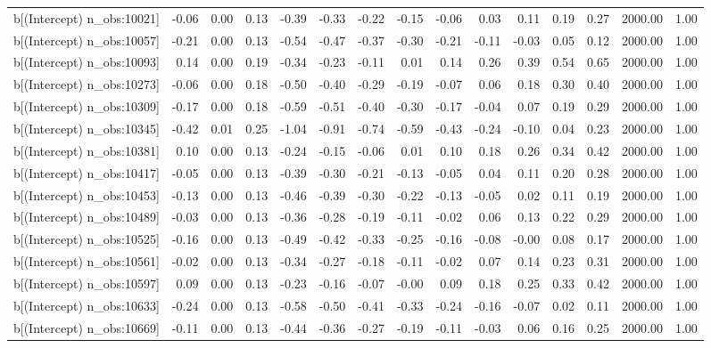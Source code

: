 \begin{table}[ht]
\begin{tabular}{rrrrrrrrrrrrrrr}
  b[(Intercept) n\_obs:10021] & -0.06 & 0.00 & 0.13 & -0.39 & -0.33 & -0.22 & -0.15 & -0.06 & 0.03 & 0.11 & 0.19 & 0.27 & 2000.00 & 1.00 \\ 
  b[(Intercept) n\_obs:10057] & -0.21 & 0.00 & 0.13 & -0.54 & -0.47 & -0.37 & -0.30 & -0.21 & -0.11 & -0.03 & 0.05 & 0.12 & 2000.00 & 1.00 \\ 
  b[(Intercept) n\_obs:10093] & 0.14 & 0.00 & 0.19 & -0.34 & -0.23 & -0.11 & 0.01 & 0.14 & 0.26 & 0.39 & 0.54 & 0.65 & 2000.00 & 1.00 \\ 
  b[(Intercept) n\_obs:10273] & -0.06 & 0.00 & 0.18 & -0.50 & -0.40 & -0.29 & -0.19 & -0.07 & 0.06 & 0.18 & 0.30 & 0.40 & 2000.00 & 1.00 \\ 
  b[(Intercept) n\_obs:10309] & -0.17 & 0.00 & 0.18 & -0.59 & -0.51 & -0.40 & -0.30 & -0.17 & -0.04 & 0.07 & 0.19 & 0.29 & 2000.00 & 1.00 \\ 
  b[(Intercept) n\_obs:10345] & -0.42 & 0.01 & 0.25 & -1.04 & -0.91 & -0.74 & -0.59 & -0.43 & -0.24 & -0.10 & 0.04 & 0.23 & 2000.00 & 1.00 \\ 
  b[(Intercept) n\_obs:10381] & 0.10 & 0.00 & 0.13 & -0.24 & -0.15 & -0.06 & 0.01 & 0.10 & 0.18 & 0.26 & 0.34 & 0.42 & 2000.00 & 1.00 \\ 
  b[(Intercept) n\_obs:10417] & -0.05 & 0.00 & 0.13 & -0.39 & -0.30 & -0.21 & -0.13 & -0.05 & 0.04 & 0.11 & 0.20 & 0.28 & 2000.00 & 1.00 \\ 
  b[(Intercept) n\_obs:10453] & -0.13 & 0.00 & 0.13 & -0.46 & -0.39 & -0.30 & -0.22 & -0.13 & -0.05 & 0.02 & 0.11 & 0.19 & 2000.00 & 1.00 \\ 
  b[(Intercept) n\_obs:10489] & -0.03 & 0.00 & 0.13 & -0.36 & -0.28 & -0.19 & -0.11 & -0.02 & 0.06 & 0.13 & 0.22 & 0.29 & 2000.00 & 1.00 \\ 
  b[(Intercept) n\_obs:10525] & -0.16 & 0.00 & 0.13 & -0.49 & -0.42 & -0.33 & -0.25 & -0.16 & -0.08 & -0.00 & 0.08 & 0.17 & 2000.00 & 1.00 \\ 
  b[(Intercept) n\_obs:10561] & -0.02 & 0.00 & 0.13 & -0.34 & -0.27 & -0.18 & -0.11 & -0.02 & 0.07 & 0.14 & 0.23 & 0.31 & 2000.00 & 1.00 \\ 
  b[(Intercept) n\_obs:10597] & 0.09 & 0.00 & 0.13 & -0.23 & -0.16 & -0.07 & -0.00 & 0.09 & 0.18 & 0.25 & 0.33 & 0.42 & 2000.00 & 1.00 \\ 
  b[(Intercept) n\_obs:10633] & -0.24 & 0.00 & 0.13 & -0.58 & -0.50 & -0.41 & -0.33 & -0.24 & -0.16 & -0.07 & 0.02 & 0.11 & 2000.00 & 1.00 \\ 
  b[(Intercept) n\_obs:10669] & -0.11 & 0.00 & 0.13 & -0.44 & -0.36 & -0.27 & -0.19 & -0.11 & -0.03 & 0.06 & 0.16 & 0.25 & 2000.00 & 1.00 \\ 

\end{tabular}
\end{table}
